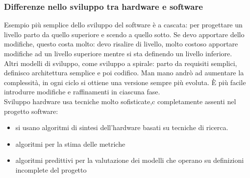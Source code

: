 \documentclass{article}
\begin{document}
\subsubsection{Differenze nello sviluppo tra hardware e software}
Esempio più semplice dello sviluppo del software è a cascata: per progettare un livello parto da quello superiore e scendo a quello sotto. Se devo apportare dello modifiche, questo costa molto: devo risalire di livello, molto costoso apportare modifiche ad un livello superiore mentre si sta definendo un livello inferiore.\\ Altri modelli di sviluppo, come sviluppo a spirale: parto da requisiti semplici, definisco architettura semplice e poi codifico. Man mano andrò ad aumentare la complessità, in ogni ciclo si ottiene una versione sempre più evoluta. È più facile introdurre modifiche e raffinamenti in ciascuna fase.\\ Sviluppo hardware usa tecniche molto sofisticate,c completamente assenti nel progetto software: 
\begin{itemize}
\item si usano algoritmi di sintesi dell'hardware basati su tecniche di ricerca.
\item algoritmi per la stima delle metriche
\item algoritmi predittivi per la valutazione dei modelli che operano su definizioni incomplete del progetto
\end{itemize}
\end{document}
